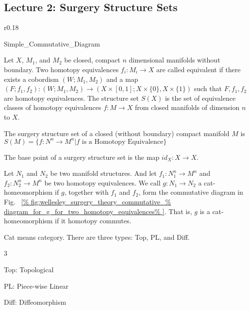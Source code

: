 \documentclass[crop=false,class=article,oneside]{standalone}
\begin{document}
    \subsection{Lecture 2: Surgery Structure Sets}
        \begin{wrapfigure}[8]{r}{0.18\textwidth}
            \centering
            \captionsetup{type=figure}
            \vspace{-4ex}
            
                      {Simple_Commutative_Diagram}
            \caption{Example of a Commutative Diagram.}
            \label{fig:wellesley_surgery_theory_commutative_%
                   diagram_for_g_for_two_homotopy_equivalences}
        \end{wrapfigure}
        Let $X$, $M_{1}$, and $M_{2}$ be closed,
        compact $n$ dimensional manifolds without boundary.
        Two homotopy equivalences $f_{i}:M_{i}\rightarrow X$
        are called equivalent if there exists a cobordism
        $(W;M_{1},M_{2})$ and a map
        $(F;f_{1},f_{2}):(W;M_{1},M_{2})%
         \rightarrow(X\times[0,1];X\times\{0\},X\times\{1\})$
        such that $F,f_{1},f_{2}$ are homotopy equivalences.
        The structure set $S(X)$ is the set of equivalence
        classes of homotopy equivalences $f:M\rightarrow X$
        from closed manifolds of dimension $n$ to $X$.
        \hfill
        \begin{definition}
            The surgery structure set of a closed
            (without boundary) compact manifold $M$ is
            $S(M)=\{f:N^{n}\rightarrow{M^{n}}|f%
             \textrm{ is a Homotopy Equivalence}\}$
        \end{definition}
        \begin{definition}
            The base point of a surgery structure
            set is the map $id_{X}:X\rightarrow X$.
        \end{definition}
        Let $N_{1}$ and $N_{2}$ be two manifold structures.
        And let $f_{1}:N_{1}^{n}\rightarrow M^{n}$ and
        $f_{2}:N_{2}^{n}\rightarrow M^{n}$ be two homotopy
        equivalences. We call $g:N_{1}\rightarrow N_{2}$ a
        cat-homeomorphism if $g$, together with $f_{1}$ and
        $f_{2}$, form the commutative diagram in Fig.~%
        \ref{%
            fig:wellesley_surgery_theory_commutative_%
            diagram_for_g_for_two_homotopy_equivalences%
        }.
        That is, $g$ is a cat-homeomorphism if it
        homotopy commutes.
        \begin{remark}
            Cat means category. There are three types:
            Top, PL, and Diff. 
            \begin{itemize}
                \begin{multicols}{3}
                    \item Top: Topological
                    \item PL: Piece-wise Linear
                    \item Diff: Diffeomorphism
                \end{multicols}
            \end{itemize}
        \end{remark}
\end{document}
